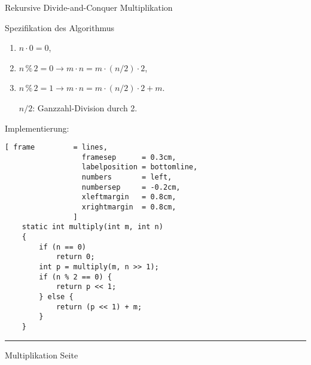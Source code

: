 \documentclass{slides}
\newcounter{mypage}
\begin{document}
\begin{slide}{}
\begin{center}
Rekursive Divide-and-Conquer Multiplikation  
\end{center}

\footnotesize
Spezifikation des Algorithmus
\begin{enumerate}
\item $n \cdot 0 = 0$,
\item $n \,\%\, 2 = 0 \rightarrow m \cdot n = m \cdot (n/2) \cdot 2$,
\item $n \,\%\, 2 = 1 \rightarrow m \cdot n = m \cdot (n/2) \cdot 2 + m$.

      $n/2$: Ganzzahl-Division durch 2.
\end{enumerate}

Implementierung:
\begin{Verbatim}[ frame         = lines, 
                  framesep      = 0.3cm, 
                  labelposition = bottomline,
                  numbers       = left,
                  numbersep     = -0.2cm,
                  xleftmargin   = 0.8cm,
                  xrightmargin  = 0.8cm,
                ]
    static int multiply(int m, int n)
    {
        if (n == 0)
            return 0;
        int p = multiply(m, n >> 1);
        if (n % 2 == 0) {
            return p << 1;
        } else {
            return (p << 1) + m;
        }
    }
\end{Verbatim}



\vspace*{\fill}
\tiny \addtocounter{mypage}{1}
\rule{17cm}{1mm}
Multiplikation  \hspace*{\fill} Seite 
\end{slide}


\end{document}

